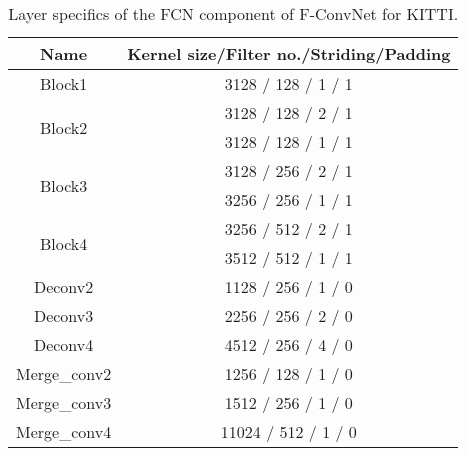 \documentclass[letterpaper, 10 pt, conference]{ieeeconf}
\begin{document}
\begin{table}[h]
	\begin{center}
	\begin{tabular}{c|c}
		\hline
		Name                    & Kernel size/Filter no./Striding/Padding \\ \hline
		Block1                  & 3128 / 128 / 1 / 1              \\
		\hline
		\multirow{2}{*}{Block2} & 3128 / 128 / 2 / 1              \\
		                        & 3128 / 128 / 1 / 1              \\
		\hline
		\multirow{2}{*}{Block3} & 3128 / 256 / 2 / 1              \\
		                        & 3256 / 256 / 1 / 1              \\
		\hline
		\multirow{2}{*}{Block4} & 3256 / 512 / 2 / 1              \\
		                        & 3512 / 512 / 1 / 1              \\
		\hline
		Deconv2                 & 1128 / 256 / 1 / 0              \\
		Deconv3                 & 2256 / 256 / 2 / 0              \\
		Deconv4                 & 4512 / 256 / 4 / 0              \\ \hline
		Merge\_conv2            & 1256 / 128 / 1 / 0              \\
		Merge\_conv3            & 1512 / 256 / 1 / 0              \\
		Merge\_conv4            & 11024 / 512 / 1 / 0             \\
		\hline
	\end{tabular}
	\caption{Layer specifics of the FCN component of F-ConvNet for KITTI. }
	\label{Tab:KITII_SPECIFICS}
	\end{center}
	\vspace{-0.5cm}
\end{table}
\end{document}
